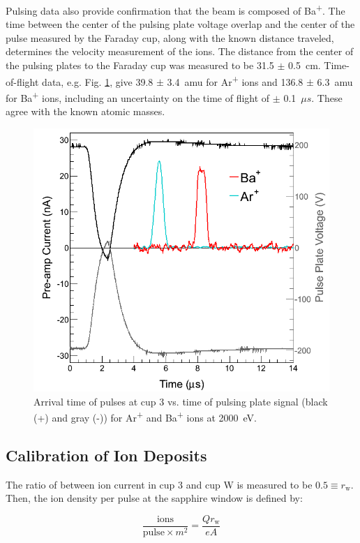 Pulsing data also provide confirmation that the beam is composed of Ba\textsuperscript{+}.  The time between the center of the pulsing plate voltage overlap and the center of the pulse measured by the Faraday cup, along with the known distance traveled, determines the velocity measurement of the ions.  The distance from the center of the pulsing plates to the Faraday cup was measured to be 31.5 $\pm$ 0.5~cm.  Time-of-flight data, e.g. Fig. \ref{fig:pulses_ArBa}, give 39.8 $\pm$ 3.4~amu for Ar\textsuperscript{+} ions and 136.8 $\pm$ 6.3~amu for Ba\textsuperscript{+} ions, including an uncertainty on the time of flight of $\pm$ 0.1~$\mu s$.  These agree with the known atomic masses.

\begin{figure}[h]
        \centering
                \includegraphics[width=.7\textwidth]{figures/pulses_BaAr.png}
                \caption{Arrival time of pulses at cup 3 vs. time of pulsing plate signal (black (+) and gray (-)) for Ar\textsuperscript{+} and Ba\textsuperscript{+} ions at 2000~eV.}
\label{fig:pulses_ArBa}
\end{figure}

\subsection{Calibration of Ion Deposits}
\label{subsec:ionDepCal}

The ratio of between ion current in cup 3 and cup W is measured to be $0.5 \equiv r_{\text{w}}$.  Then, the ion density per pulse at the sapphire window is defined by:

\begin{equation}
\frac{\text{ions}}{\text{pulse} \times m^{2}} = \frac{Q r_{\text{w}}}{e A}
\label{eqn:ion_density}
\end{equation}

